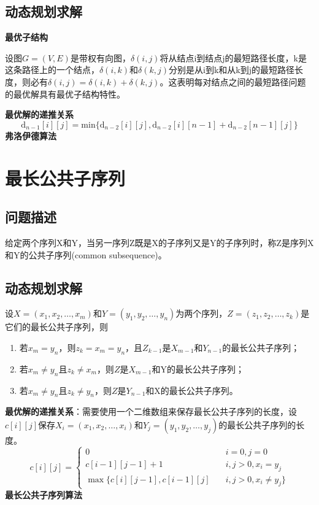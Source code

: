 \subsection*{动态规划求解}
\textbf{最优子结构}

设图$G=(V,E)$是带权有向图，$\delta(i,j)$将从结点i到结点j的最短路径长度，k是这条路径上的一个结点，$\delta(i,k)$和$\delta(k,j)$分别是从i到k和从k到j的最短路径长度，则必有$\delta(i,j)=\delta(i,k)+\delta(k,j)$。这表明每对结点之间的最短路径问题的最优解具有最优子结构特性。

\textbf{最优解的递推关系}
\begin{equation}
	\mathrm{d}_{n-1}[i][j]=\mathrm{min}\{\mathrm{d}_{n-2}[i][j],\mathrm{d}_{n-2}[i][n-1]+\mathrm{d}_{n-2}[n-1][j] \}
\end{equation}
\textbf{弗洛伊德算法}

\section{最长公共子序列}
\subsection*{问题描述}
给定两个序列X和Y，当另一序列Z既是X的子序列又是Y的子序列时，称Z是序列X和Y的公共子序列(common subsequence)。
\subsection*{动态规划求解}
设$X=(x_1,x_2,\dots,x_m)$和$Y=(y_1,y_2,\dots,y_n)$为两个序列，$Z=(z_1,z_2,\dots,z_k)$是它们的最长公共子序列，则
\begin{enumerate}
	\item 若$x_m=y_n$，则$z_k=x_m=y_n$，且$Z_{k-1}$是$X_{m-1}$和$Y_{n-1}$的最长公共子序列；
	\item 若$x_m\ne y_n$且$z_k\ne x_m$，则$Z$是$X_{m-1}$和Y的最长公共子序列；
	\item 若$x_m\ne y_n$且$z_k\ne y_n$，则$Z$是$Y_{n-1}$和X的最长公共子序列。
\end{enumerate}
\textbf{最优解的递推关系}：需要使用一个二维数组来保存最长公共子序列的长度，设$c[i][j]$保存$X_i=(x_1,x_2,\dots,x_i)$和$Y_j=(y_1,y_2,\dots,y_j)$的最长公共子序列的长度。
\begin{equation}
	c[i][j]=\begin{cases}
		0\quad &i=0,j=0\\
		c[i-1][j-1]+1\quad &i,j>0,x_i=y_j\\
		\max \{c[i][j-1],c[i-1][j]\quad &i,j>0,x_i\ne y_j \}
	\end{cases}
\end{equation}
\textbf{最长公共子序列算法}


